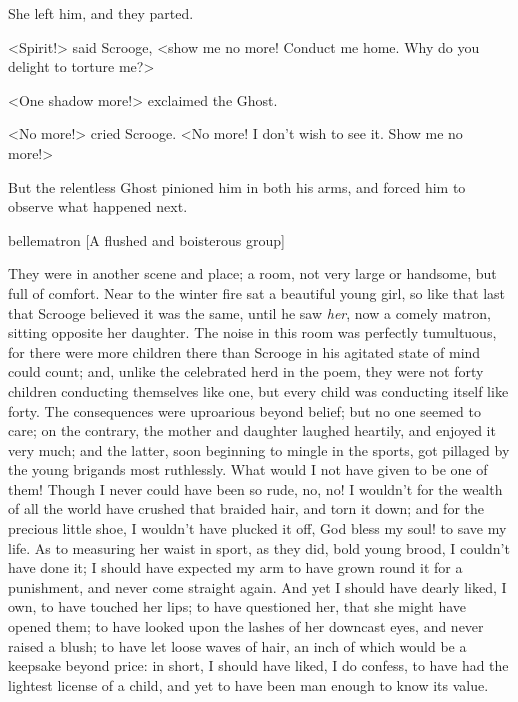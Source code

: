 She left him, and they parted.

<Spirit!> said Scrooge, <show me no more! Conduct me home. Why do you delight to torture me?>

<One shadow more!> exclaimed the Ghost.

<No more!> cried Scrooge. <No more! I don't wish to see it. Show me no more!>

But the relentless Ghost pinioned him in both his arms, and forced him to observe what happened next.

\begin{colorbigpic}
	[\basicscale]
	{bellematron}
	[A flushed and boisterous group]
\end{colorbigpic}


They were in another scene and place; a room, not very large or handsome, but full of comfort. Near to the winter fire sat a beautiful young girl, so like that last that Scrooge believed it was the same, until he saw \textit{her}, now a comely matron, sitting opposite her daughter. The noise in this room was perfectly tumultuous, for there were more children there than Scrooge in his agitated state of mind could count; and, unlike the celebrated herd in the poem, they were not forty children conducting themselves like one, but every child was conducting itself like forty. The consequences were uproarious beyond belief; but no one seemed to care; on the contrary, the mother and daughter laughed heartily, and enjoyed it very much; and the latter, soon beginning to mingle in the sports, got pillaged by the young brigands most ruthlessly. What would I not have given to be one of them! Though I never could have been so rude, no, no! I wouldn't for the wealth of all the world have crushed that braided hair, and torn it down; and for the precious little shoe, I wouldn't have plucked it off, God bless my soul! to save my life. As to measuring her waist in sport, as they did, bold young brood, I couldn't have done it; I should have expected my arm to have grown round it for a punishment, and never come straight again. And yet I should have dearly liked, I own, to have touched her lips; to have questioned her, that she might have opened them; to have looked upon the lashes of her downcast eyes, and never raised a blush; to have let loose waves of hair, an inch of which would be a keepsake beyond price: in short, I should have liked, I do confess, to have had the lightest license of a child, and yet to have been man enough to know its value.

